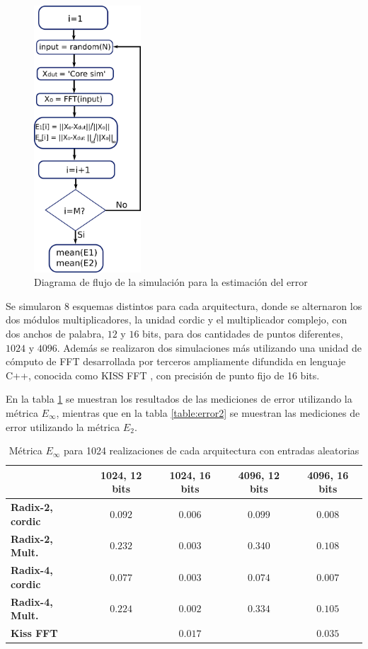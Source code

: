 \begin{figure}[htb!]
        \centering
        \includegraphics[width=4cm]{./figures/error_sim.png}
        \caption{Diagrama de flujo de la simulación para la estimación del error}
        \label{fig:errorsim}
\end{figure}

Se simularon $8$ esquemas distintos para cada arquitectura, donde se alternaron los dos módulos
multiplicadores, la unidad cordic y el multiplicador complejo, con dos anchos de palabra, $12$ y
$16$ bits, para dos cantidades de puntos diferentes, $1024$ y $4096$.
Además se realizaron dos simulaciones más utilizando una unidad de cómputo de FFT desarrollada por
terceros ampliamente difundida en lenguaje C++, conocida como KISS FFT \cite{KISSFFT},
con precisión de punto fijo de 16 bits.

En la tabla \ref{table:errorInf} se muestran los resultados de las mediciones de error utilizando la
métrica $E_\infty$, mientras que en la tabla \ref{table:error2} se muestran las mediciones de error
utilizando la métrica $E_2$.

\begin{table}[htb!]
\begin{tabular}{l c c c c}
 & \textbf{1024, 12 bits} & \textbf{1024, 16 bits} & \textbf{4096, 12 bits} & \textbf{4096, 16 bits}\\ \hline 
\textbf{Radix-2, cordic} & $0.092$ & $0.006$ & $0.099$ & $0.008 $\\
\textbf{Radix-2, Mult.} & $0.232$ & $0.003$ & $0.340$ & $0.108$\\
\textbf{Radix-4, cordic} & $0.077$ & $0.003$ & $0.074$ & $0.007$\\
\textbf{Radix-4, Mult.} & $0.224$ & $0.002$ & $0.334$ & $0.105$\\
\textbf{Kiss FFT} & $ $ & $0.017$ & $ $ & $0.035$\\\hline
\end{tabular}
\caption{Métrica $E_\infty$ para 1024 realizaciones de cada arquitectura con entradas aleatorias}
\label{table:errorInf}
\end{table}

